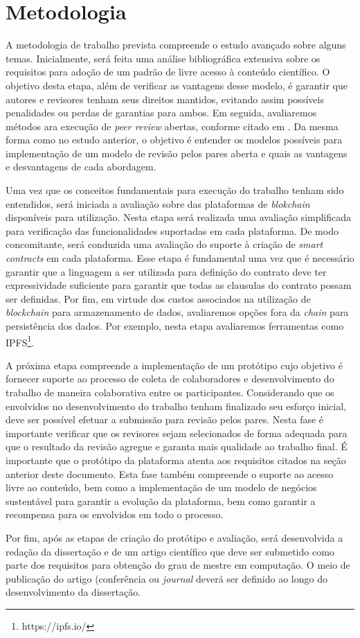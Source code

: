 \chapter{Metodologia}
A metodologia de trabalho prevista compreende o estudo avançado sobre alguns temas. Inicialmente, será feita uma análise bibliográfica extensiva sobre os requisitos para adoção de um padrão de livre acesso à conteúdo científico. O objetivo desta etapa, além de verificar as vantagens desse modelo, é garantir que autores e revisores tenham seus direitos mantidos, evitando assim possíveis penalidades ou perdas de garantias para ambos. Em seguida, avaliaremos métodos ara execução de \textit{peer review} abertas, conforme citado em \cite{InteractivePeerReview2010}. Da mesma forma como no estudo anterior, o objetivo é entender os modelos possíveis para implementação de um modelo de revisão pelos pares aberta e quais as vantagens e desvantagens de cada abordagem.

Uma vez que os conceitos fundamentais para execução do trabalho tenham sido entendidos, será iniciada a avaliação sobre das plataformas de \textit{blokchain} disponíveis para utilização. Nesta etapa será realizada uma avaliação simplificada para verificação das funcionalidades suportadas em cada plataforma. De modo concomitante, será conduzida uma avaliação do suporte à criação de \textit{smart contracts} em cada plataforma. Esse etapa é fundamental uma vez que é necessário garantir que a linguagem a ser utilizada para definição do contrato deve ter expressividade suficiente para garantir que todas as clausulas do contrato possam ser definidas. Por fim, em virtude dos custos associados na utilização de \textit{blockchain} para armazenamento de dados, avaliaremos opções fora da \textit{chain} para persistência dos dados. Por exemplo, nesta etapa avaliaremos ferramentas como IPFS\footnote{https://ipfs.io/}.

A próxima etapa compreende a implementação de um protótipo cujo objetivo é fornecer suporte ao processo de coleta de colaboradores e desenvolvimento do trabalho de maneira colaborativa entre os participantes. Considerando que os envolvidos no desenvolvimento do trabalho tenham finalizado seu esforço inicial, deve ser possível efetuar a submissão para revisão pelos pares. Nesta fase é importante verificar que os revisores sejam selecionados de forma adequada para que o resultado da revisão agregue e garanta mais qualidade ao trabalho final. É importante que o protótipo da plataforma atenta aos requisitos citados na seção anterior deste documento. Esta fase também compreende o suporte ao acesso livre ao conteúdo, bem como a implementação de um modelo de negócios sustentável para garantir a evolução da plataforma, bem como garantir a recompensa para os envolvidos em todo o processo.

Por fim, após as etapas de criação do protótipo e avaliação, será desenvolvida a redação da dissertação e de um artigo científico que deve ser submetido como parte dos requisitos para obtenção do grau de mestre em computação. O meio de publicação do artigo (conferência ou \textit{journal} deverá ser definido ao longo do desenvolvimento da dissertação.